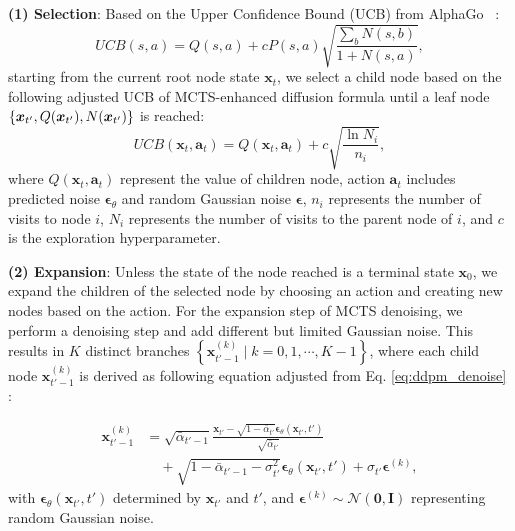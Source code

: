 \textbf{(1) Selection}: Based on the Upper Confidence Bound (UCB) from AlphaGo ~\cite{silver2016mastering}:
\begin{equation}
UCB(s, a) = Q(s, a) + c P(s, a) \sqrt{\frac{\sum_b N(s, b)}{1 + N(s, a)}},
\end{equation}
starting from the current root node state \( \boldsymbol{x}_t \), we select a child node based on the following adjusted UCB of MCTS-enhanced diffusion formula until a leaf node $\{{\boldsymbol{x}}_{t'}, Q({\boldsymbol{x}}_{t'}), N({\boldsymbol{x}}_{t'})\}$ is reached:
\begin{equation}
\label{eq:ucb_denoise}
UCB(\boldsymbol{x}_t, \boldsymbol{a}_t) = Q(\boldsymbol{x}_t, \boldsymbol{a}_t) + c \sqrt{\frac{\ln N_i}{n_i}},
\end{equation}
where $Q(\boldsymbol{x}_t, \boldsymbol{a}_t)$ represent the value of children node, action $\boldsymbol{a}_t$ includes predicted noise $\boldsymbol\epsilon_{\theta}$ and random Gaussian noise $\boldsymbol\epsilon$, \( n_i \) represents the number of visits to node \( i \), \( N_i \) represents the number of visits to the parent node of \( i \), and \( c \) is the exploration hyperparameter.

\textbf{(2) Expansion}: Unless the state of the node reached is a terminal state $\boldsymbol{x}_0$, we expand the children of the selected node by choosing an action and creating new nodes based on the action.
For the expansion step of MCTS denoising, we perform a denoising step and add different but limited Gaussian noise. This results in \( K \) distinct branches \( \left\{ \boldsymbol x_{t'-1}^{(k)} \mid k = 0, 1, \cdots, K-1\right\} \), where each child node $\boldsymbol{x}_{t'-1}^{(k)}$ is derived as following equation adjusted from Eq. \ref{eq:ddpm_denoise} :

\setlength{\belowdisplayskip}{2pt}
\begin{equation}
\label{eq:mcts_denoise}
\begin{split}
    \boldsymbol{x}_{t'-1}^{(k)} &= \sqrt{\bar\alpha_{t'-1}} \frac{\boldsymbol{x}_{t'} - \sqrt{1 - \bar\alpha_{t'}} \boldsymbol\epsilon_{\theta}\left(\boldsymbol{x}_{t'}, t'\right)}{\sqrt{\bar\alpha_{t'}}} \\
    &\quad + \sqrt{1 - \bar\alpha_{t'-1} - \sigma_{t'}^{2}}\boldsymbol\epsilon_{\theta}\left(\boldsymbol{x}_{t'}, t'\right) + \sigma_{t'} \boldsymbol\epsilon^{(k)},
\end{split}
\end{equation}
with \( \boldsymbol{\epsilon}_\theta(\boldsymbol{x}_{t'}, t') \) determined by \( \boldsymbol{x}_{t'} \) and \( t' \), and \( \boldsymbol{\epsilon}^{(k)}\sim\mathcal{N}(\mathbf{0},\mathbf{I}) \) representing random Gaussian noise.


